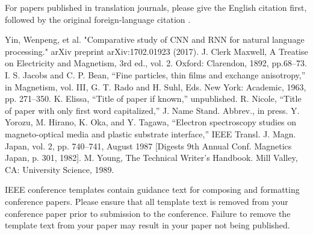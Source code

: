 \documentclass[conference]{IEEEtran}
\begin{document}
For papers published in translation journals, please give the English 
citation first, followed by the original foreign-language citation \cite{b6}.

\begin{thebibliography}{00}
 Yin, Wenpeng, et al. "Comparative study of CNN and RNN for natural language processing." arXiv preprint arXiv:1702.01923 (2017).
 J. Clerk Maxwell, A Treatise on Electricity and Magnetism, 3rd ed., vol. 2. Oxford: Clarendon, 1892, pp.68--73.
 I. S. Jacobs and C. P. Bean, ``Fine particles, thin films and exchange anisotropy,'' in Magnetism, vol. III, G. T. Rado and H. Suhl, Eds. New York: Academic, 1963, pp. 271--350.
 K. Elissa, ``Title of paper if known,'' unpublished.
 R. Nicole, ``Title of paper with only first word capitalized,'' J. Name Stand. Abbrev., in press.
 Y. Yorozu, M. Hirano, K. Oka, and Y. Tagawa, ``Electron spectroscopy studies on magneto-optical media and plastic substrate interface,'' IEEE Transl. J. Magn. Japan, vol. 2, pp. 740--741, August 1987 [Digests 9th Annual Conf. Magnetics Japan, p. 301, 1982].
 M. Young, The Technical Writer's Handbook. Mill Valley, CA: University Science, 1989.
\end{thebibliography}
\vspace{12pt}
\color{red}
IEEE conference templates contain guidance text for composing and formatting conference papers. Please ensure that all template text is removed from your conference paper prior to submission to the conference. Failure to remove the template text from your paper may result in your paper not being published.
\end{document}
